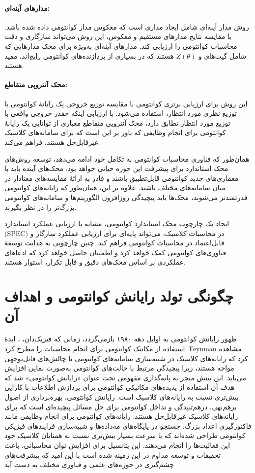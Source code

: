\paragraph{مدارهای آینه‌ای:}
روش مدار آینه‌ای شامل ایجاد مداری است که معکوس مدار کوانتومی داده شده باشد. با مقایسه نتایج مدارهای مستقیم و معکوس، این روش می‌تواند سازگاری و دقت محاسبات کوانتومی را ارزیابی کند. مدارهای آینه‌ای به‌ویژه برای محک مدارهایی که شامل گیت‌های  و $Z(\theta)$ هستند که در بسیاری از پردازنده‌های کوانتومی رایج‌اند، مفید هستند.

\paragraph{محک آنتروپی متقاطع:}
این روش برای ارزیابی برتری کوانتومی با مقایسه توزیع خروجی یک رایانهٔ کوانتومی با توزیع نظری مورد انتظار، استفاده می‌شود. با ارزیابی اینکه چقدر خروجی واقعی با توزیع مورد انتظار تطابق دارد، محک آنتروپی متقاطع معیاری از توانایی یک رایانهٔ کوانتومی برای انجام وظایفی که باور بر این است که برای سامانه‌های کلاسیک غیرقابل‌حل هستند، فراهم می‌کند.

همان‌طور که فناوری محاسبات کوانتومی به تکامل خود ادامه می‌دهد، توسعه روش‌های محک استاندارد برای پیشرفت این حوزه حیاتی خواهد بود. محک‌های آینده باید با معماری‌های جدید کوانتومی قابل‌تطبیق باشند و قادر به ارائهٔ مقایسه‌های معنادار در میان سامانه‌های مختلف باشند. علاوه بر این، همان‌طور که رایانه‌های کوانتومی قدرتمندتر می‌شوند، محک‌ها باید پیچیدگی روزافزون الگوریتم‌ها و سامانه‌های کوانتومی بزرگ‌تر را در نظر بگیرند.

ایجاد یک چارچوب محک استاندارد کوانتومی، مشابه با ارزیابی عملکرد استاندارد (SPEC) در محاسبات کلاسیک، می‌تواند پایه‌ای برای ارزیابی عملکرد سازگار و قابل‌اعتماد در محاسبات کوانتومی فراهم کند. چنین چارچوبی به هدایت توسعهٔ فناوری‌های کوانتومی کمک خواهد کرد و اطمینان حاصل خواهد کرد که ادعاهای عملکردی بر اساس محک‌های دقیق و قابل تکرار، استوار هستند.

\section{چگونگی تولد رایانش کوانتومی و اهداف آن}
ظهور رایانش کوانتومی به اوایل دهه ۱۹۸۰ بازمی‌گردد، زمانی که فیزیک‌دان، ، ایدهٔ استفاده از مکانیک کوانتومی برای انجام محاسبات را مطرح کرد. Feynman مشاهده کرد که رایانه‌های کلاسیک در شبیه‌سازی سامانه‌های کوانتومی با چالش‌های قابل‌توجهی مواجه هستند، زیرا پیچیدگی مرتبط با حالت‌های کوانتومی به‌صورت نمایی افزایش می‌یابد. این بینش منجر به پایه‌گذاری مفهومی تحت عنوان «رایانش کوانتومی» شد که هدف آن استفاده از پدیده‌های مکانیکی کوانتومی برای پردازش اطلاعات با کارایی بیش‌تری نسبت به رایانه‌های کلاسیک است. رایانش کوانتومی، بهره‌برداری از اصول برهم‌نهی، درهم‌تنیدگی و تداخل کوانتومی برای حل مسائل پیچیده‌ای است که برای رایانه‌های کلاسیک غیرقابل‌حل هستند. رایانه‌های کوانتومی برای انجام وظایفی مانند فاکتورگیری اعداد بزرگ، جستجو در پایگاه‌های مه‌داده‌ها و شبیه‌سازی فرایندهای فیزیکی کوانتومی طراحی شده‌اند که با سرعت بسیار بیش‌تری نسبت به همتایان کلاسیک خود این فعالیت‌ها را انجام می‌دهند. این پتانسیل برای افزایش توان محاسباتی، باعث تحقیقات و توسعه مداوم در این زمینه شده است با این امید که پیشرفت‌های چشم‌گیری در حوزه‌های علمی و فناوری مختلف به دست آید \cite{nielsen_quantum_2010}.
